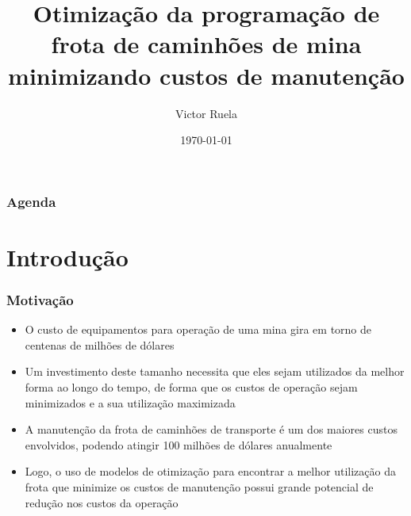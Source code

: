\documentclass{beamer}
\title[Otimização em Redes 2020/1]{Otimização da programação de frota de caminhões de mina minimizando custos de manutenção} %
\author{Victor Ruela} %
\institute[PPGEE - UFMG] %
{
Programa de Pós-Graduação em Engenharia Elétrica\\ Universidade Federal de Minas Gerais \\ %
\medskip
\textit{victorspruela@ufmg.br} %
}
\date{\today} %
\begin{document}
\begin{frame}
\titlepage %
\end{frame}

\begin{frame}
\frametitle{Agenda} %
\tableofcontents %
\end{frame}


\section{Introdução} %


\begin{frame}
	\frametitle{Motivação}
	\begin{itemize}
		\item O custo de equipamentos para operação de uma mina gira em torno de centenas de milhões de dólares 
		\item Um investimento deste tamanho necessita que eles sejam utilizados da melhor forma ao longo do tempo, de forma que os custos de operação sejam minimizados e a sua utilização maximizada
		\item A manutenção da frota de caminhões de transporte é um dos maiores custos envolvidos, podendo atingir 100 milhões de dólares anualmente
		\item Logo, o uso de modelos de otimização para encontrar a melhor utilização da frota que minimize os custos de manutenção possui grande potencial de redução nos custos da operação
	\end{itemize}
\end{frame}
\end{document}
